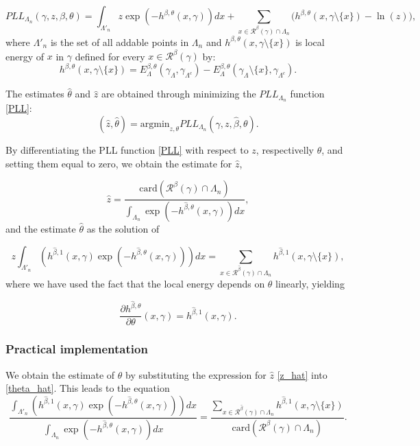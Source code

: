 \documentclass[12pt,a4paper]{report}
\begin{document}
\begin{equation}\label{PLL}
PLL_{\Lambda_n}(\gamma,z,\beta, \theta) = \int_{\Lambda'_n} z \exp (-h^{\beta,\theta}(x,\gamma)) dx + \sum_{x\in\mathcal R^\beta(\gamma)\cap \Lambda_n} \big(h^{\beta,\theta}(x,\gamma\setminus\{x\}) - \ln(z)\big),
\end{equation}
where $\Lambda'_n$ is the set of all addable points in $\Lambda_n$ and $h^{\beta,\theta}(x, \gamma \setminus \{x\})$ is local energy of $x$ in $\gamma$ defined for every $x\in\mathcal R^\beta(\gamma)$ by:
$$h^{\beta,\theta}(x, \gamma \setminus \{x\}) = E^{\beta,\theta}_\Lambda(\gamma_\Lambda, \gamma_{\Lambda^c}) - E^{\beta,\theta}_\Lambda(\gamma_\Lambda\setminus\{x\}, \gamma_{\Lambda^c}).$$

The estimates $\hat\theta$ and $\hat z$ are obtained through minimizing the $PLL_{\Lambda_n}$ function \ref{PLL}:
$$(\hat z, \hat\theta) = \text{argmin}_{z,\theta} PLL_{\Lambda_n} (\gamma, z, \hat\beta,\theta).$$

By differentiating the PLL function \ref{PLL} with respect to $z$, respectivelly $\theta$, and setting them equal to zero, we obtain the estimate for $\hat z$,

\begin{equation}\label{z_hat}
\hat z = \frac{\mbox{card}(\mathcal R^\beta(\gamma)\cap \Lambda_n)}{\int_{\Lambda_n} \exp{\left( -h^{\hat\beta,\theta}(x,\gamma)\right)} dx},
\end{equation}
and the estimate $\hat\theta$ as the solution of

\begin{equation}\label{theta_hat} 
z \int_{\Lambda'_n} (h^{\hat\beta,1}(x,\gamma)\exp{\left(-h^{\hat\beta,\theta}(x,\gamma)\right)}) dx = \sum_{x \in \mathcal R^{\hat\beta}(\gamma)\cap \Lambda_n} h^{\hat\beta,1}(x,\gamma\setminus\{x\}),
\end{equation}
where we have used the fact that the local energy depends on $\theta$ linearly, yielding

$$\frac{\partial h^{\hat\beta,\theta}}{\partial \theta} (x,\gamma) = h^{\hat\beta,1}(x,\gamma).$$

\subsubsection{Practical implementation}
We obtain the estimate of $\theta$ by substituting the expression for $\hat z$ \ref{z_hat} into \ref{theta_hat}.
This leads to the equation
$$ 
\frac{\int_{\Lambda'_n} (h^{\hat\beta,1}(x,\gamma)\exp{\left(-h^{\hat\beta,\theta}(x,\gamma)\right)}) dx} {  \int_{\Lambda_n} \exp{\left( -h^{\hat\beta,\theta}(x,\gamma)\right)} dx} 
= \frac {\sum_{x \in \mathcal R^{\hat\beta}(\gamma)\cap \Lambda_n} h^{\hat\beta,1}(x,\gamma\setminus\{x\})} { \mbox{card}(\mathcal R^\beta(\gamma)\cap \Lambda_n) }. 
$$
\end{document}
